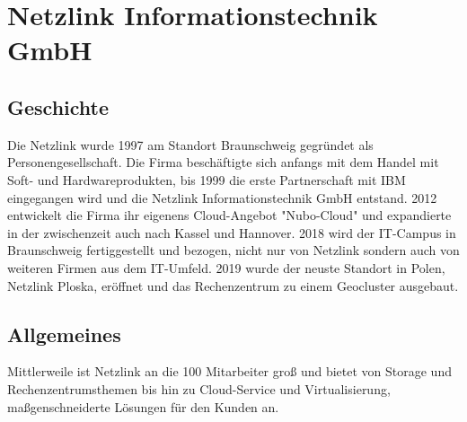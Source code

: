 \chapter{Netzlink Informationstechnik GmbH}

\section{Geschichte} 
Die Netzlink wurde 1997 am Standort Braunschweig gegründet als Personengesellschaft. 
Die Firma beschäftigte sich anfangs mit dem Handel mit Soft- und Hardwareprodukten, bis 1999 die erste Partnerschaft mit IBM eingegangen wird und die Netzlink Informationstechnik GmbH entstand.
2012 entwickelt die Firma ihr eigenens Cloud-Angebot "Nubo-Cloud" und expandierte in der zwischenzeit auch nach Kassel und Hannover. 
2018 wird der IT-Campus in Braunschweig fertiggestellt und bezogen, nicht nur von Netzlink sondern auch von weiteren Firmen aus dem IT-Umfeld. 
2019 wurde der neuste Standort in Polen, Netzlink Ploska, eröffnet und das Rechenzentrum zu einem Geocluster ausgebaut. 
\cite{Netzlink_history}

\section{Allgemeines}
Mittlerweile ist Netzlink an die 100 Mitarbeiter groß und bietet von Storage und Rechenzentrumsthemen bis hin zu Cloud-Service und Virtualisierung, maßgenschneiderte Lösungen für den Kunden an.
\cite{Netzlink_history}